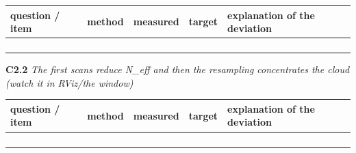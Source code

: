 \documentclass[a4paper,10pt]{article}
\begin{document}
\begin{tabular}{|>{\raggedright\hyphenpenalty 500\arraybackslash}p{2.87cm}|>{\raggedright\hyphenpenalty 500\arraybackslash}p{2.28cm}|>{\raggedright\hyphenpenalty 500\arraybackslash}p{2.87cm}|>{\raggedright\hyphenpenalty 500\arraybackslash}p{2.28cm}|>{\raggedright\hyphenpenalty 500\arraybackslash}p{3.70cm}|}
\hline
\textbf{question / item} & \textbf{method} & \textbf{measured} & \textbf{target} & \textbf{explanation of the deviation} \\
\hline
\rule{0pt}{2.4em} & \rule{0pt}{2.4em} & \rule{0pt}{2.4em} & \rule{0pt}{2.4em} & \rule{0pt}{2.4em} \\
\rule{0pt}{2.4em} & \rule{0pt}{2.4em} & \rule{0pt}{2.4em} & \rule{0pt}{2.4em} & \rule{0pt}{2.4em} \\
\rule{0pt}{2.4em} & \rule{0pt}{2.4em} & \rule{0pt}{2.4em} & \rule{0pt}{2.4em} & \rule{0pt}{2.4em} \\
\rule{0pt}{2.4em} & \rule{0pt}{2.4em} & \rule{0pt}{2.4em} & \rule{0pt}{2.4em} & \rule{0pt}{2.4em} \\
\hline
\end{tabular}

\vspace{4pt}\noindent\textbf{C2.2} \emph{The first scans reduce N\_eff and then the resampling concentrates the cloud (watch it in RViz/the window)}

\begin{tabular}{|>{\raggedright\hyphenpenalty 500\arraybackslash}p{2.87cm}|>{\raggedright\hyphenpenalty 500\arraybackslash}p{2.28cm}|>{\raggedright\hyphenpenalty 500\arraybackslash}p{2.87cm}|>{\raggedright\hyphenpenalty 500\arraybackslash}p{2.28cm}|>{\raggedright\hyphenpenalty 500\arraybackslash}p{3.70cm}|}
\hline
\textbf{question / item} & \textbf{method} & \textbf{measured} & \textbf{target} & \textbf{explanation of the deviation} \\
\hline
\rule{0pt}{2.4em} & \rule{0pt}{2.4em} & \rule{0pt}{2.4em} & \rule{0pt}{2.4em} & \rule{0pt}{2.4em} \\
\rule{0pt}{2.4em} & \rule{0pt}{2.4em} & \rule{0pt}{2.4em} & \rule{0pt}{2.4em} & \rule{0pt}{2.4em} \\
\rule{0pt}{2.4em} & \rule{0pt}{2.4em} & \rule{0pt}{2.4em} & \rule{0pt}{2.4em} & \rule{0pt}{2.4em} \\
\rule{0pt}{2.4em} & \rule{0pt}{2.4em} & \rule{0pt}{2.4em} & \rule{0pt}{2.4em} & \rule{0pt}{2.4em} \\
\hline
\end{tabular}
\end{document}
